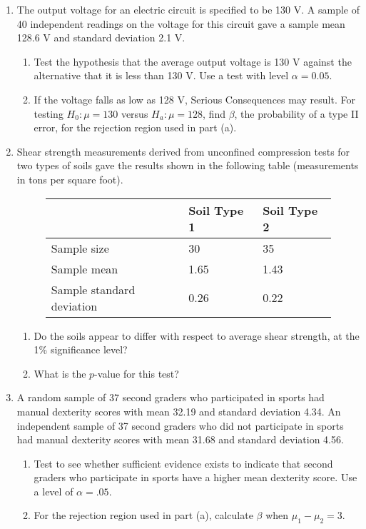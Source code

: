 \documentclass[12pt]{article}
\begin{document}
\begin{enumerate}
\item The output voltage for an electric circuit is specified to be 130 V. A sample of 40 independent readings on the voltage for this circuit gave a sample mean 128.6 V and standard deviation 2.1 V. 
\begin{enumerate}
\item Test the hypothesis that the average output voltage is 130 V against the alternative that it is less than 130 V. Use a test with level $\alpha = 0.05$.
\item If the voltage falls as low as 128 V, Serious Consequences may result. For testing $H_0: \mu = 130$ versus $H_a: \mu = 128$, find $\beta$, the probability of a type II error, for the rejection region used in part (a).
\end{enumerate}

\item Shear strength measurements derived from unconfined compression tests for two types of soils gave the results shown in the following table (measurements in tons per square foot). 
\begin{figure}[H]
\centering
\begin{tabular}{l@{\hskip 2cm}l@{\hskip 2cm}l}
\toprule
& Soil Type 1 & Soil Type 2\\
\midrule
Sample size & 30 & 35 \\
Sample mean & 1.65 & 1.43 \\
Sample standard deviation & 0.26 & 0.22 \\
\bottomrule
\end{tabular}
\end{figure} 

\begin{enumerate}
\item Do the soils appear to differ with respect to average shear strength, at the 1\% significance level?
\item What is the $p$-value for this test?
\end{enumerate}

\item A random sample of 37 second graders who participated in sports had manual dexterity scores with mean 32.19 and standard deviation 4.34. An independent sample of 37 second graders who did not participate in sports had manual dexterity scores with mean 31.68 and standard deviation 4.56.
\begin{enumerate}
\item Test to see whether sufficient evidence exists to indicate that second graders who participate in sports have a higher mean dexterity score. Use a level of $\alpha = .05$.
\item For the rejection region used in part (a), calculate $\beta$ when $\mu_1 − \mu_2 = 3$.
\end{enumerate}


\end{enumerate}
\end{document}
